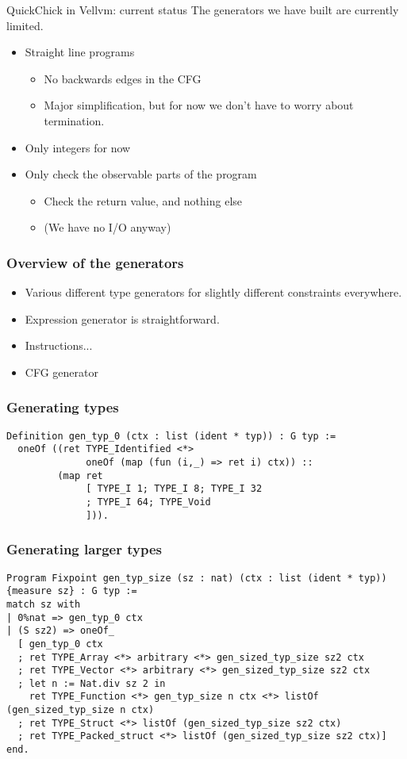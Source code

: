 \documentclass{beamer}
\begin{document}
\begin{frame}{QuickChick in Vellvm: current status}
  The generators we have built are currently limited.

  \begin{itemize}
  \item Straight line programs
    \begin{itemize}
    \item No backwards edges in the CFG
    \item Major simplification, but for now we don't have to worry
      about termination.
    \end{itemize}
  \item Only integers for now
  \item Only check the observable parts of the program
    \begin{itemize}
    \item Check the return value, and nothing else
    \item (We have no I/O anyway)
    \end{itemize}
  \end{itemize}
\end{frame}

\begin{frame}
  \frametitle{Overview of the generators}
  
  \begin{itemize}
  \item Various different type generators for slightly different
    constraints everywhere.
  \item Expression generator is straightforward.
  \item Instructions...
  \item CFG generator
  \end{itemize}
\end{frame}

\begin{frame}[fragile]
  \frametitle{Generating types}
\begin{lstlisting}[language=SSR]
Definition gen_typ_0 (ctx : list (ident * typ)) : G typ :=
  oneOf ((ret TYPE_Identified <*>
              oneOf (map (fun (i,_) => ret i) ctx)) ::
         (map ret
              [ TYPE_I 1; TYPE_I 8; TYPE_I 32
              ; TYPE_I 64; TYPE_Void
              ])).
\end{lstlisting}
\end{frame}

\begin{frame}[fragile]
  \frametitle{Generating larger types}
\begin{lstlisting}[language=SSR]
Program Fixpoint gen_typ_size (sz : nat) (ctx : list (ident * typ)) {measure sz} : G typ :=
match sz with
| 0%nat => gen_typ_0 ctx
| (S sz2) => oneOf_
  [ gen_typ_0 ctx
  ; ret TYPE_Array <*> arbitrary <*> gen_sized_typ_size sz2 ctx
  ; ret TYPE_Vector <*> arbitrary <*> gen_sized_typ_size sz2 ctx
  ; let n := Nat.div sz 2 in
    ret TYPE_Function <*> gen_typ_size n ctx <*> listOf (gen_sized_typ_size n ctx)
  ; ret TYPE_Struct <*> listOf (gen_sized_typ_size sz2 ctx)
  ; ret TYPE_Packed_struct <*> listOf (gen_sized_typ_size sz2 ctx)]
end.
\end{lstlisting}
\end{frame}
\end{document}
